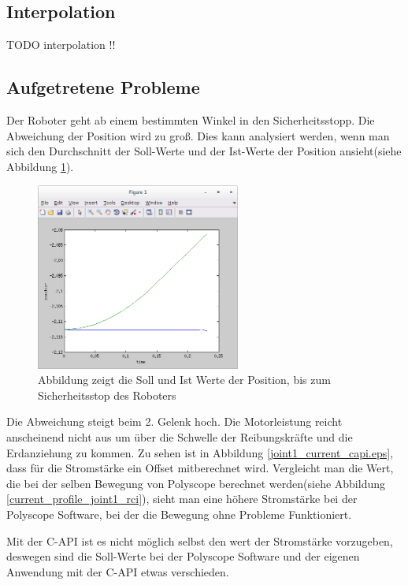 \subsection{Interpolation}
\label{sub:interpolation_rel}

TODO interpolation !!

\subsection{Aufgetretene Probleme}
\label{sub:capi-problems_rel}

Der Roboter geht ab einem bestimmten Winkel in den Sicherheitsstopp. Die Abweichung der Position wird zu groß. Dies kann analysiert werden, wenn man sich den Durchschnitt der Soll-Werte und der Ist-Werte der Position ansieht(siehe Abbildung \ref{fig:position_join1}).
\\
\begin{figure}[H]
  \centering
    \includegraphics[width=0.6\textwidth]{pic/joint1_position_capi.png}
      \caption[Soll-und Ist-Werte der Position]{Abbildung zeigt die Soll und Ist Werte der Position, bis zum Sicherheitsstop des Roboters}
      \label{fig:position_join1}
\end{figure}

Die Abweichung steigt beim 2. Gelenk hoch. Die Motorleistung reicht anscheinend nicht aus um über die Schwelle der Reibungskräfte und die Erdanziehung zu kommen. Zu sehen ist in Abbildung \ref{joint1_current_capi.eps}, dass für die Stromstärke ein Offset mitberechnet wird. Vergleicht man die Wert, die bei der selben Bewegung von Polyscope berechnet werden(siehe Abbildung \ref{current_profile_joint1_rci}), sieht man eine höhere Stromstärke bei der Polyscope Software, bei der die Bewegung ohne Probleme Funktioniert.

Mit der C-\ac{API} ist es nicht möglich selbst den wert der Stromstärke vorzugeben, deswegen sind die Soll-Werte bei der Polyscope Software und der eigenen Anwendung mit der C-API etwas verschieden.

